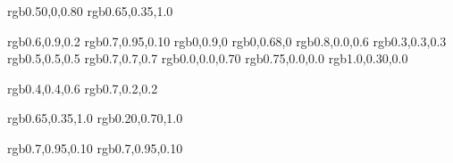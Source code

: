 

\usepackage{color}
\usepackage{xcolor}
\definecolor{darkpurple}  {rgb}{0.50,0,0.80}      %
\definecolor{purple}      {rgb}{0.65,0.35,1.0}    %

\definecolor{spring}    {rgb}{0.6,0.9,0.2}    %
\definecolor{lime}      {rgb}{0.7,0.95,0.10}  %
\definecolor{fluorescentgreen}   {rgb}{0,0.9,0}        %
\definecolor{green}     {rgb}{0,0.68,0}       %
\definecolor{magenta}   {rgb}{0.8,0.0,0.6}    %
\definecolor{dgrey}     {rgb}{0.3,0.3,0.3}    %
\definecolor{grey}      {rgb}{0.5,0.5,0.5}    %
\definecolor{lgrey}     {rgb}{0.7,0.7,0.7}    %
\definecolor{darkblue}  {rgb}{0.0,0.0,0.70}   %
\definecolor{darkred}   {rgb}{0.75,0.0,0.0}   %
\definecolor{orangered} {rgb}{1.0,0.30,0.0}   %





\definecolor{oldcolor}   {rgb}{0.4,0.4,0.6}  %
\definecolor{usedcolor}  {rgb}{0.7,0.2,0.2}  %

\definecolor{jb}             {rgb}{0.65,0.35,1.0}  %
\definecolor{todoblue}       {rgb}{0.20,0.70,1.0}  %

\definecolor{organizational} {rgb}{0.7,0.95,0.10}   %
\definecolor{org}            {rgb}{0.7,0.95,0.10}   %
